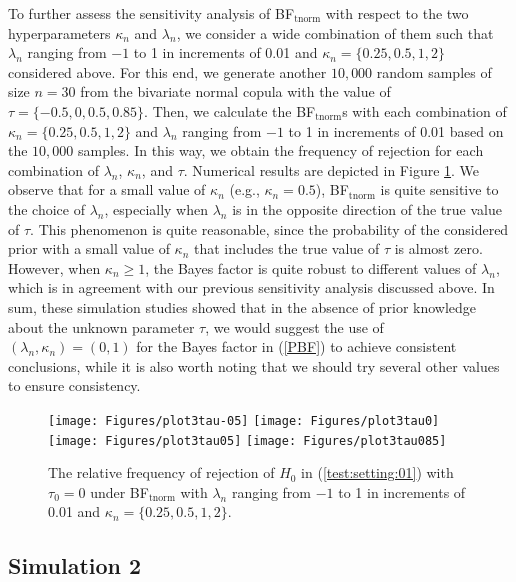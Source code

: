 \documentclass[11pt]{article}
\begin{document}
To further assess the sensitivity analysis of BF$_\mathrm{tnorm}$ with respect to the two hyperparameters $\kappa_n$ and $\lambda_n$, we consider a wide combination of them such that $\lambda_n$ ranging from $-1$ to 1 in increments of 0.01 and $\kappa_n = \{0.25, 0.5, 1, 2\}$ considered above. For this end, we generate another $10,000$ random samples of size $n = 30$ from the bivariate normal copula with the value of $\tau = \{-0.5, 0, 0.5, 0.85\}$. Then, we calculate the BF$_\mathrm{tnorm}$s with each combination of $\kappa_n = \{0.25, 0.5, 1, 2\}$ and $\lambda_n$ ranging from $-1$ to 1 in increments of 0.01 based on the $10,000$ samples. In this way, we obtain the frequency of rejection for each combination of $\lambda_n$, $\kappa_n$, and $\tau$. Numerical results are depicted in Figure \ref{FIG:FR3}. We observe that for a small value of $\kappa_n$ (e.g., $\kappa_n = 0.5$), BF$_\mathrm{tnorm}$ is quite sensitive to the choice of $\lambda_n$, especially when $\lambda_n$ is in the opposite direction of the true value of $\tau$. This phenomenon is quite reasonable, since the probability of the considered prior with a small value of $\kappa_n$ that includes the true value of $\tau$ is almost zero. However, when $\kappa_n \geq 1$, the Bayes factor is quite robust to different values of $\lambda_n$, which is in agreement with our previous sensitivity analysis discussed above. In sum, these simulation studies showed that in the absence of prior knowledge about the unknown parameter $\tau$, we would suggest the use of $(\lambda_n, \kappa_n) = (0, 1)$ for the Bayes factor in (\ref{PBF}) to achieve consistent conclusions, while it is also worth noting that we should try several other values to ensure consistency.

{
\begin{figure}[!t]
\centering
\texttt{[image: Figures/plot3tau-05]}
\texttt{[image: Figures/plot3tau0]}
\texttt{[image: Figures/plot3tau05]}
\texttt{[image: Figures/plot3tau085]}
\caption{The relative frequency of rejection of $H_0$ in (\ref{test:setting:01}) with $\tau_0 = 0$ under BF$_\mathrm{tnorm}$ with $\lambda_n$ ranging from $-1$ to 1 in increments of 0.01 and $\kappa_n = \{ 0.25, 0.5, 1, 2\}$.} \label{FIG:FR3}
\end{figure}
}

\subsection{Simulation 2} \label{simulation:02}
\end{document}

